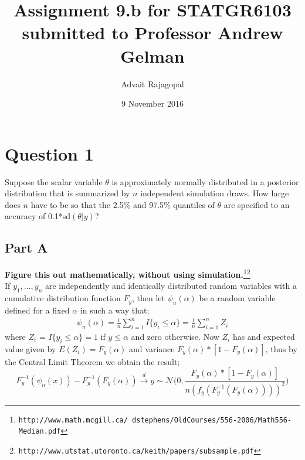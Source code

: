 \documentclass{article}
\title{Assignment 9.b for \textbf{STATGR6103}\\
\large submitted to Professor Andrew Gelman}
\date{9 November 2016}
\author{Advait Rajagopal}
\begin{document}
  \maketitle
\section{Question 1}
Suppose the scalar variable $\theta$ is approximately normally distributed in a posterior distribution that is summarized by $n$ independent simulation draws. How large does $n$ have to be so that the 2.5\% and 97.5\% quantiles of $\theta$ are specified to an accuracy of 0.1*sd$(\theta|y)$?
\subsection{Part A}
\textbf{Figure this out mathematically, without using simulation.}\footnote{\texttt{http://www.math.mcgill.ca/~dstephens/OldCourses/556-2006/Math556-Median.pdf}}\footnote{\texttt{http://www.utstat.utoronto.ca/keith/papers/subsample.pdf}}\\
If $y_1, ... , y_n$ are independently and identically distributed random variables with a cumulative distribution function $F_y$, then let $\psi_n(\alpha)$ be a random variable defined for a fixed $\alpha$ in such a way that;
\begin{align*}
\psi_n(\alpha) = \frac{1}{n} \sum_{i=1}^{n} I\{y_i \leq \alpha \} = \frac{1}{n}\sum_{i=1}^{n}Z_i
\end{align*}
where $Z_i$ = $I\{y_i \leq \alpha \} = 1$ if $y \leq \alpha$ and zero otherwise. Now $Z_i$ has and expected value given by $E(Z_i) = F_y(\alpha)$ and variance $F_y(\alpha)*[1- F_y(\alpha)]$, thus by the Central Limit Theorem we obtain the result;
$$F_y^{-1}(\psi_n(x)) - F_y^{-1}(F_y(\alpha)) \xrightarrow{d} y \sim \mathcal{N} \Bigg(0, \frac{F_y(\alpha)*[1- F_y(\alpha)]}{n(f_y(F_y^{-1}(F_y(\alpha))))^2}\Bigg) $$
\end{document}
